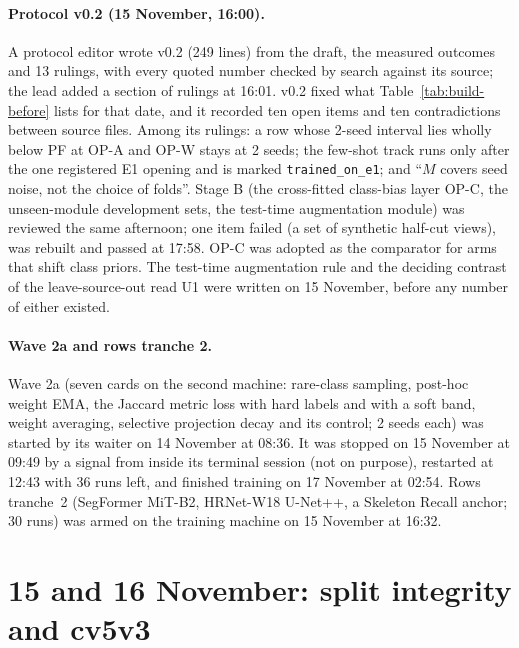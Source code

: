 \paragraph{Protocol v0.2 (15 November, 16:00).} A protocol editor wrote v0.2 (249 lines) from the draft, the measured outcomes and
13 rulings, with every quoted number checked by search against its source; the lead added a section of rulings at 16:01. v0.2
fixed what Table~\ref{tab:build-before} lists for that date, and it recorded ten open items and ten contradictions between source
files. Among its rulings: a row whose 2-seed interval lies wholly below PF at OP-A and OP-W stays at 2 seeds; the few-shot track
runs only after the one registered E1 opening and is marked \texttt{trained\_on\_e1}; and ``$M$ covers seed noise, not the choice of
folds''. Stage B (the cross-fitted class-bias layer OP-C, the unseen-module development sets, the test-time augmentation module)
was reviewed the same afternoon; one item failed (a set of synthetic half-cut views), was rebuilt and passed at 17:58. OP-C was
adopted as the comparator for arms that shift class priors. The test-time augmentation rule and the deciding contrast of the
leave-source-out read U1 were written on 15 November, before any number of either existed.

\paragraph{Wave 2a and rows tranche 2.} Wave 2a (seven cards on the second machine: rare-class sampling, post-hoc weight EMA, the
Jaccard metric loss with hard labels and with a soft band, weight averaging, selective projection decay and its control; 2 seeds
each) was started by its waiter on 14 November at 08:36. It was stopped on 15 November at 09:49 by a signal from inside its terminal
session (not on purpose), restarted at 12:43 with 36 runs left, and finished training on 17 November at 02:54. Rows tranche~2
(SegFormer MiT-B2, HRNet-W18 U-Net++, a Skeleton Recall anchor; 30 runs) was armed on the training machine on 15 November at
16:32.

\section{15 and 16 November: split integrity and cv5v3}\label{sec:build-split}

